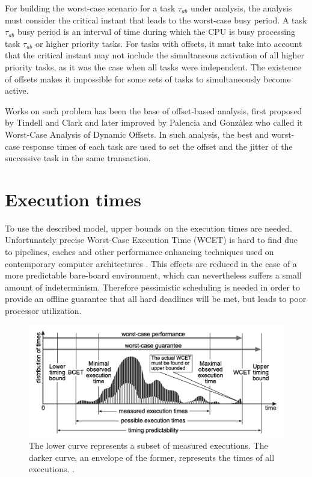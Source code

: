 \documentclass{article}
\begin{document}
For building the worst-case scenario for a task $\tau_{ab}$ under analysis, the analysis must consider the critical instant that leads to the worst-case busy period. A task $\tau_{ab}$ busy period is an interval of time during which the CPU is busy processing task $\tau_{ab}$ or higher priority tasks. For tasks with offsets, it must take into account that the critical instant may not include the simultaneous activation of all higher priority tasks, as it was the case when all tasks were independent. The existence of offsets makes it impossible for some sets of tasks to simultaneously become active.

Works on such problem has been the base of offset-based analysis, first proposed by Tindell and Clark \cite{tindell-offsets} and later improved by Palencia and Gonzàlez \cite{pessimistic-rma} who called it Worst-Case Analysis of Dynamic Offsets. In such analysis, the best and worst-case response times of each task are used to set the offset and the jitter of the successive task in the same transaction.

\section{Execution times}

To use the described model, upper bounds on the execution times are needed. Unfortunately precise Worst-Case Execution Time (WCET) is hard to find due to pipelines, caches and other performance enhancing techniques used on contemporary computer architectures \cite{wcet-problem}. This effects are reduced in the case of a more predictable bare-board environment, which can nevertheless suffers a small amount of indeterminism. Therefore pessimistic scheduling is needed in order to provide an offline guarantee that all hard deadlines will be met, but leads to poor processor utilization.

\begin{figure}[!htbp]
\centering
\includegraphics[width=5in]{images/wcet}
\caption{The lower curve represents a subset of measured executions. The darker curve, an envelope of the former, represents the times of all executions. \cite{wcet-problem}.}
\label{wcet-curve}
\end{figure}
\end{document}
